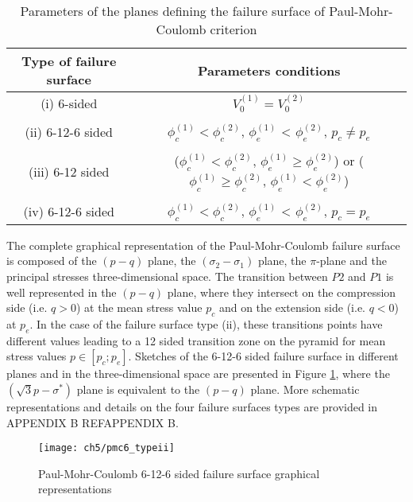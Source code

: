 \begin{table}
    \centering 
    \begin{tabular}{cc}
        \hline 
        Type of failure surface & Parameters conditions   \\
        \hline
        \hline
        (i) 6-sided & $V_0^{(1)} = V_0^{(2)}$ \\
        \\
        (ii) 6-12-6 sided & $\phi_{c}^{(1)} < \phi_{c}^{(2)}$, $\phi_{e}^{(1)}$ < $\phi_{e}^{(2)}$, $p_c \neq p_e$\\ 
        \\
        (iii) 6-12 sided & ($\phi_{c}^{(1)} < \phi_{c}^{(2)}$, $\phi_{e}^{(1)} \geq \phi_{e}^{(2)}$) or ($\phi_{c}^{(1)} \geq \phi_{c}^{(2)}$, $\phi_{e}^{(1)} < \phi_{e}^{(2)}$)\\
        \\
        (iv) 6-12-6 sided & $\phi_{c}^{(1)} < \phi_{c}^{(2)}$, $\phi_{e}^{(1)}$ < $\phi_{e}^{(2)}$, $p_c = p_e$\\ 
        \hline
    \end{tabular}
    \captionsetup{justification=centering}
    \caption{Parameters of the planes defining the failure surface of Paul-Mohr-Coulomb criterion}
    \label{tb5:pmc6p_pyramids}
\end{table}

The complete graphical representation of the Paul-Mohr-Coulomb failure surface is composed of the $(p-q)$ plane, the $(\sigma_2-\sigma_1)$ plane, the $\pi$-plane and the principal stresses three-dimensional space. The transition between $P2$ and $P1$ is well represented in the $(p-q)$ plane, where they intersect on the compression side (i.e. $q > 0$) at the mean stress value $p_c$ and on the extension side (i.e. $q < 0$) at $p_e$. In the case of the failure surface type (ii), these transitions points have different values leading to a 12 sided transition zone on the pyramid for mean stress values $p \in \left[p_c;p_e\right]$. Sketches of the 6-12-6 sided failure surface in different planes and in the three-dimensional space are presented in Figure \ref{fig5:6pmc_typeii}, where the $(\sqrt{3}p-\sigma^*)$ plane is equivalent to the $(p-q)$ plane. More schematic representations and details on the four failure surfaces types are provided in APPENDIX B REF{APPENDIX B}.

\begin{figure}
    \centering
    \texttt{[image: ch5/pmc6\_typeii]}
    \caption{Paul-Mohr-Coulomb 6-12-6 sided failure surface graphical representations}
    \label{fig5:6pmc_typeii}
\end{figure}


